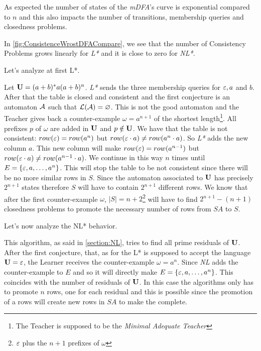 As expected the number of states of the \textit{mDFA}'s curve is exponential compared to $n$ and this also impacts the number of transitions, membership queries and closedness problems.

In \cref{fig:ConsistenceWrostDFACompare}, we see that the number of Consistency Problems grows linearly for \textit{L*} and it is close to zero for \textit{NL*}.

Let's analyze at first L*.

Let $\mathbf{U} = (a+b)^*a(a+b)^n$. \textit{L*} sends the three membership queries for $\varepsilon, a$ and $b$. After that the table is closed and consistent and the first conjecture is an automaton $\mathcal{A}$ such that $\mathcal{L}(\mathcal{A}) = \varnothing$. This is not the good automaton and the Teacher gives back a counter-example $\omega =  a^{n+1}$ of the shortest length\footnote{The Teacher is supposed to be the \textit{Minimal Adequate Teacher}}. All prefixes $p$ of $\omega$ are added in $\mathbf{U}$ and $p \notin \mathbf{U}$. We have that the table is not consistent: $row(\varepsilon) = row(a^n)$ but $row(\varepsilon \cdot a) \neq row(a^n \cdot a)$. So \textit{L*} adds the new column $a$. This new column will make $row(\varepsilon) = row(a^{n-1})$ but $row(\varepsilon \cdot a) \neq row(a^{n-1} \cdot a)$. We continue in this way $n$ times until $E = \{\varepsilon, a, \dots, a^n\}$. This will stop the table to be not consistent since there will be no more similar rows in $S$. Since the automaton associated to $\mathbf{U}$ has precisely $2^{n+1}$ states therefore $S$ will have to contain $2^{n+1}$ different rows. We know that after the first counter-example $\omega$, $|S| = n + 2$\footnote{$\varepsilon$ plus the $n+1$ prefixes of $\omega$} will have to find $2^{n+1}-(n+1)$ closedness problems to promote the necessary number of rows from $SA$ to $S$.

Let's now analyze the NL* behavior.

This algorithm, as said in \cref{section:NL}, tries to find all prime residuals of $\mathbf{U}$. After the first conjecture, that, as for the L* is supposed to accept the language $\mathbf{U} = \varepsilon$, the Learner receives the counter-example $\omega = a^n$. Since \textit{NL} adds the counter-example to $E$ and so it will directly make $E = \{\varepsilon, a, \dots, a^n\}$. This coincides with the number of residuals of $\mathbf{U}$. In this case the  algorithms only has to promote $n$ rows, one for each residual and this is possible since the promotion of a rows will create new rows in $SA$ to make the \OT complete.

